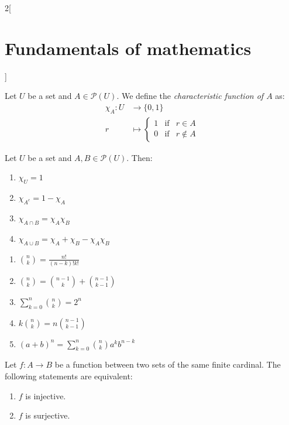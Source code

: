 \documentclass[../../../main.tex]{subfiles}
\begin{document}
\begin{multicols}{2}[\section{Fundamentals of mathematics}]
\begin{prop}
    \end{prop}
    \begin{definition}
        Let $U$ be a set and $A\in\mathcal{P}(U)$. We define the \textit{characteristic function of $A$} as:
        \begin{align*}
            \chi_A:U & \longrightarrow\{0,1\} \\
            r        & \longmapsto \left\{
            \begin{array}{rcl}
                1 & \text{if} & r\in A    \\
                0 & \text{if} & r\notin A
            \end{array}\right.
        \end{align*}
    \end{definition}
    \begin{prop}
        Let $U$ be a set and $A,B\in\mathcal{P}(U)$. Then:
        \begin{enumerate}
            \item $\chi_U=1$
            \item $\chi_{A^c}=1-\chi_A$
            \item $\chi_{A\cap B}=\chi_A\chi_B$
            \item $\chi_{A\cup B}=\chi_A+\chi_B-\chi_A\chi_B$
        \end{enumerate}
    \end{prop}
    \begin{prop}\hfill
        \begin{enumerate}
            \item $\binom{n}{k}=\frac{n!}{(n-k)!k!}$
            \item $\binom{n}{k}=\binom{n-1}{k}+\binom{n-1}{k-1}$
            \item $\sum_{k=0}^n\binom{n}{k}=2^n$
            \item $k\binom{n}{k}=n\binom{n-1}{k-1}$
            \item $(a+b)^n=\sum_{k=0}^n\binom{n}{k}a^kb^{n-k}$
        \end{enumerate}
    \end{prop}
    \begin{prop}
        Let $f:A\rightarrow B$ be a function between two sets of the same finite cardinal. The following statements are equivalent:
        \begin{enumerate}
            \item $f$ is injective.
            \item $f$ is surjective.

\end{enumerate}
\end{prop}
\end{multicols}
\end{document}
